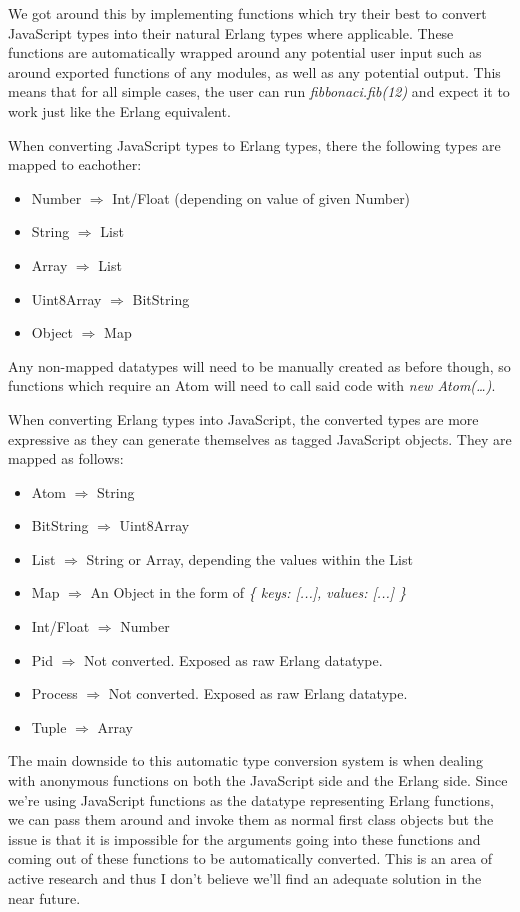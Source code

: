 \documentclass[twoside,12pt,titlepage,a4paper]{article}
\begin{document}
We got around this by implementing functions which try their best to convert JavaScript types into their natural Erlang types where applicable. These functions are automatically wrapped around any potential user input such as around exported functions of any modules, as well as any potential output. This means that for all simple cases, the user can run \textit{fibbonaci.fib(12)} and expect it to work just like the Erlang equivalent.

When converting JavaScript types to Erlang types, there the following types are mapped to eachother:

\begin{itemize}
	\item Number $\Rightarrow$ Int/Float (depending on value of given Number)
	\item String $\Rightarrow$ List
	\item Array $\Rightarrow$ List
	\item Uint8Array $\Rightarrow$ BitString
	\item Object $\Rightarrow$ Map
\end{itemize}

Any non-mapped datatypes will need to be manually created as before though, so functions which require an Atom will need to call said code with \textit{new Atom(\dots)}.

When converting Erlang types into JavaScript, the converted types are more expressive as they can generate themselves as tagged JavaScript objects. They are mapped as follows:

\begin{itemize}
	\item Atom $\Rightarrow$ String
	\item BitString $\Rightarrow$ Uint8Array
	\item List $\Rightarrow$ String or Array, depending the values within the List
	\item Map $\Rightarrow$ An Object in the form of \textit{\{ keys: [...], values: [...] \}}
	\item Int/Float $\Rightarrow$ Number
	\item Pid $\Rightarrow$ Not converted. Exposed as raw Erlang datatype.
	\item Process $\Rightarrow$ Not converted. Exposed as raw Erlang datatype.
	\item Tuple $\Rightarrow$ Array
\end{itemize}

The main downside to this automatic type conversion system is when dealing with anonymous functions on both the JavaScript side and the Erlang side. Since we're using JavaScript functions as the datatype representing Erlang functions, we can pass them around and invoke them as normal first class objects but the issue is that it is impossible for the arguments going into these functions and coming out of these functions to be automatically converted. This is an area of active research and thus I don't believe we'll find an adequate solution in the near future.
\end{document}
